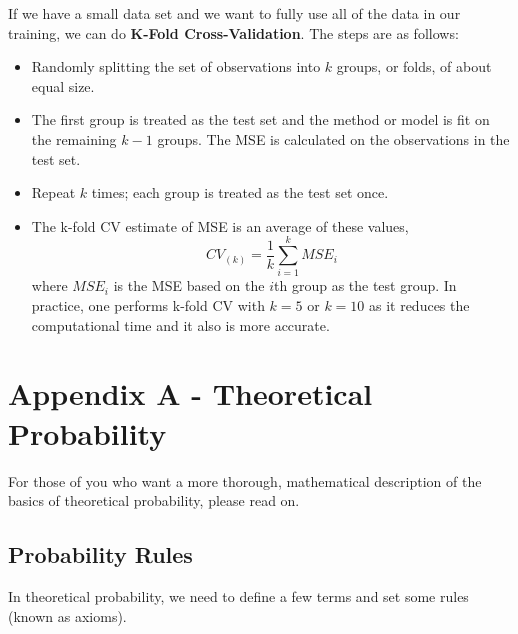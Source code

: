\documentclass[]{book}
\newenvironment{Shaded}{\begin{snugshade}}{\end{snugshade}}
\newcommand{\CommentTok}[1]{\textcolor[rgb]{0.56,0.35,0.01}{\textit{#1}}}
\newcommand{\DataTypeTok}[1]{\textcolor[rgb]{0.13,0.29,0.53}{#1}}
\newcommand{\DecValTok}[1]{\textcolor[rgb]{0.00,0.00,0.81}{#1}}
\newcommand{\KeywordTok}[1]{\textcolor[rgb]{0.13,0.29,0.53}{\textbf{#1}}}
\newcommand{\NormalTok}[1]{#1}
\newcommand{\OperatorTok}[1]{\textcolor[rgb]{0.81,0.36,0.00}{\textbf{#1}}}
\newcommand{\StringTok}[1]{\textcolor[rgb]{0.31,0.60,0.02}{#1}}
\begin{document}
If we have a small data set and we want to fully use all of the data in our training, we can do \textbf{K-Fold Cross-Validation}. The steps are as follows:

\begin{itemize}
\item
  Randomly splitting the set of observations into \(k\) groups, or folds, of about equal size.
\item
  The first group is treated as the test set and the method or model is fit on the remaining \(k-1\) groups. The MSE is calculated on the observations in the test set.
\item
  Repeat \(k\) times; each group is treated as the test set once.
\item
  The k-fold CV estimate of MSE is an average of these values,
  \[CV_{(k)} = \frac{1}{k}\sum^k_{i=1}MSE_i \]
  where \(MSE_i\) is the MSE based on the \(i\)th group as the test group. In practice, one performs k-fold CV with \(k=5\) or \(k=10\) as it reduces the computational time and it also is more accurate.
\end{itemize}

\begin{Shaded}
\end{Shaded}

\hypertarget{appendix-a---theoretical-probability}{%
\chapter{Appendix A - Theoretical Probability}\label{appendix-a---theoretical-probability}}

For those of you who want a more thorough, mathematical description of the basics of theoretical probability, please read on.

\hypertarget{probability-rules}{%
\section{Probability Rules}\label{probability-rules}}

In theoretical probability, we need to define a few terms and set some rules (known as axioms).
\end{document}
